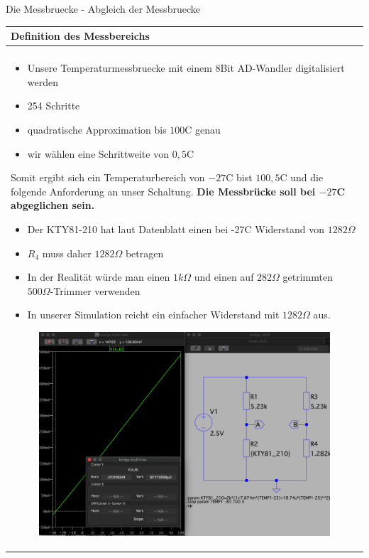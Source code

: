 \begin{frame}[t]{Die Messbruecke - Abgleich der Messbruecke}

    \begin{spacing}{0.9} \begin{tiny}
            \begin{table}[h!]
                \begin{tabular}{p{10cm} }
                    \hline
                    \textbf{Definition des Messbereichs} \\
                    \hline                               \\
                    \begin{minipage}{\textwidth}
                        \begin{itemize}
                            \item Unsere Temperaturmessbruecke mit einem 8Bit AD-Wandler digitalisiert werden
                            \item 254 Schritte
                            \item quadratische Approximation bis $100$C genau
                            \item wir wählen eine Schrittweite von $0,5$C
                        \end{itemize}
                        Somit ergibt sich ein Temperaturbereich von $-27$C bist $100,5$C und die folgende Anforderung an unser Schaltung.\newline\newline
                        \textbf{Die Messbrücke soll bei $-27$C abgeglichen sein.}
                        \begin{itemize}
                            \item Der KTY81-210 hat laut Datenblatt einen bei -27C Widerstand von $1282\Omega$
                            \item $R_4$ muss daher $1282\Omega$ betragen
                            \item In der Realität würde man einen $1k\Omega$ und einen auf $282\Omega$ getrimmten $500\Omega$-Trimmer verwenden
                            \item In unserer Simulation reicht ein einfacher Widerstand mit $1282\Omega$ aus.
                        \end{itemize}
                        \begin{figure}
                            \includegraphics[width=0.5\linewidth]{pictures/kty81_getrimmet.png}

\end{figure}
\end{minipage}
\end{tabular}
\end{table}
\end{tiny}
\end{spacing}
\end{frame}
